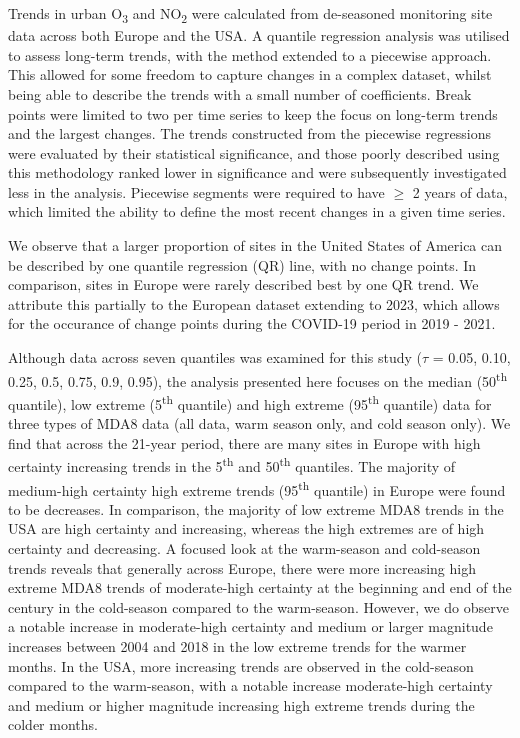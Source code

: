 \documentclass[journal abbreviation, manuscript]{copernicus}
\begin{document}
Trends in urban O\textsubscript{3} and NO\textsubscript{2} were calculated from de-seasoned monitoring site data across both Europe and the USA. A quantile regression analysis was utilised to assess long-term trends, with the method extended to a piecewise approach. This allowed for some freedom to capture changes in a complex dataset, whilst being able to describe the trends with a small number of coefficients. Break points were limited to two per time series to keep the focus on long-term trends and the largest changes. The trends constructed from the piecewise regressions were evaluated by their statistical significance, and those poorly described using this methodology ranked lower in significance and were subsequently investigated less in the analysis. Piecewise segments were required to have $\ge$ 2 years of data, which limited the ability to define the most recent changes in a given time series.

We observe that a larger proportion of sites in the United States of America can be described by one quantile regression (QR) line, with no change points. In comparison, sites in Europe were rarely described best by one QR trend. We attribute this partially to the European dataset extending to 2023, which allows for the occurance of change points during the COVID-19 period in 2019 - 2021. 

Although data across seven quantiles was examined for this study ($\tau$ = 0.05, 0.10, 0.25, 0.5, 0.75, 0.9, 0.95), the analysis presented here focuses on the median (50\textsuperscript{th} quantile), low extreme (5\textsuperscript{th} quantile) and high extreme (95\textsuperscript{th} quantile) data for three types of MDA8 data (all data, warm season only, and cold season only). We find that across the 21-year period, there are many sites in Europe with high certainty increasing trends in the 5\textsuperscript{th} and 50\textsuperscript{th} quantiles. The majority of medium-high certainty high extreme trends (95\textsuperscript{th} quantile) in Europe were found to be decreases. In comparison, the majority of low extreme MDA8 trends in the USA are high certainty and increasing, whereas the high extremes are of high certainty and decreasing. A focused look at the warm-season and cold-season trends reveals that generally across Europe, there were more increasing high extreme MDA8 trends of moderate-high certainty at the beginning and end of the century in the cold-season compared to the warm-season. However, we do observe a notable increase in moderate-high certainty and medium or larger magnitude increases between 2004 and 2018 in the low extreme trends for the warmer months. In the USA, more increasing trends are observed in the cold-season compared to the warm-season, with a notable increase moderate-high certainty and medium or higher magnitude increasing high extreme trends during the colder months.
\end{document}
